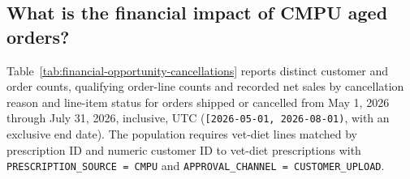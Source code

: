 \clearpage
\subsection{What is the financial impact of CMPU aged orders?}\label{subsec:financial-opportunity-analysis}
Table~\ref{tab:financial-opportunity-cancellations} reports distinct customer and order counts,
qualifying order-line counts and recorded net sales by cancellation reason and line-item status
for orders shipped or cancelled from May 1, 2026 through July 31, 2026, inclusive, UTC
(\texttt{[2026-05-01, 2026-08-01)}, with an exclusive end date).
The population requires vet-diet lines matched by prescription ID and numeric
customer ID to vet-diet prescriptions with
\texttt{PRESCRIPTION\_SOURCE = CMPU} and
\texttt{APPROVAL\_CHANNEL = CUSTOMER\_UPLOAD}.

